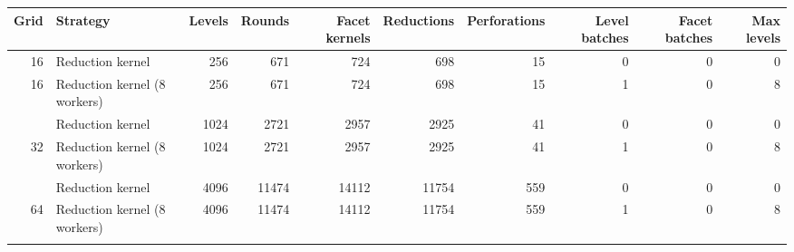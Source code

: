 \begin{tabular}{rlrrrrrrrr}
\toprule
Grid & Strategy & Levels & Rounds & Facet kernels & Reductions & Perforations & Level batches & Facet batches & Max levels \\
\midrule
16 & Reduction kernel & 256 & 671 & 724 & 698 & 15 & 0 & 0 & 0 \\
16 & Reduction kernel (8 workers) & 256 & 671 & 724 & 698 & 15 & 1 & 0 & 8 \\
\addlinespace
32 & Reduction kernel & 1024 & 2721 & 2957 & 2925 & 41 & 0 & 0 & 0 \\
32 & Reduction kernel (8 workers) & 1024 & 2721 & 2957 & 2925 & 41 & 1 & 0 & 8 \\
\addlinespace
64 & Reduction kernel & 4096 & 11474 & 14112 & 11754 & 559 & 0 & 0 & 0 \\
64 & Reduction kernel (8 workers) & 4096 & 11474 & 14112 & 11754 & 559 & 1 & 0 & 8 \\
\addlinespace
\bottomrule
\end{tabular}
